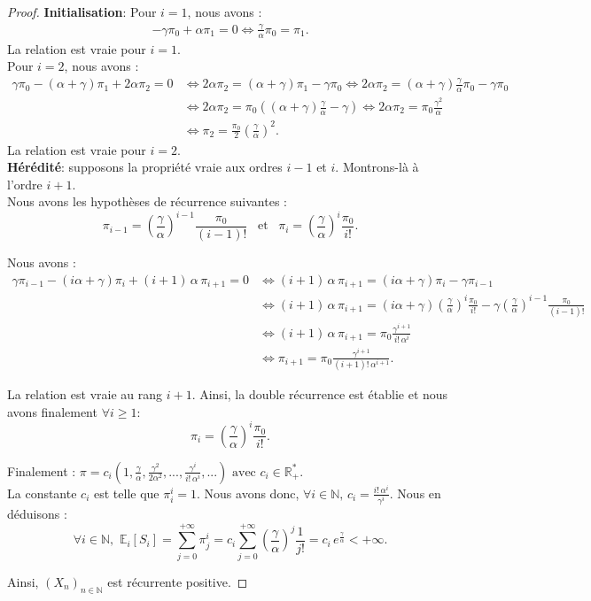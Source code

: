 \documentclass[12pt,a4paper]{report}
\theoremstyle{remark}
\begin{document}
\begin{proof}
\textbf{Initialisation}: Pour $i=1$, nous avons :
\begin{align*}
 -\gamma\pi_0+\alpha\pi_1 = 0 \iff  \frac{\gamma}{\alpha}\pi_0=\pi_1.
\end{align*}
La relation est vraie pour $i=1$.\\

Pour $i=2$, nous avons :
\begin{align*}
 \gamma\pi_{0}-(\alpha + \gamma)\pi_{1}+2\alpha\pi_{2} = 0 &\iff 2\alpha\pi_{2}=(\alpha + \gamma)\pi_{1}- \gamma\pi_{0} \iff 2\alpha\pi_{2}=(\alpha + \gamma)\frac{\gamma}{\alpha}\pi_0- \gamma\pi_{0}\\
 &\iff  2\alpha\pi_{2}=\pi_0((\alpha + \gamma)\frac{\gamma}{\alpha}- \gamma ) \iff 2\alpha\pi_{2}=\pi_0\frac{\gamma^2}{\alpha} \\
 &\iff \pi_{2}=\frac{\pi_0}{2}\left(\frac{\gamma}{\alpha}\right)^2.
\end{align*}
La relation est vraie pour $i=2$.\\

\textbf{Hérédité}: supposons la propriété vraie aux ordres $i-1$ et $i$. Montrons-là à l'ordre $i+1$.\\

Nous avons les hypothèses de récurrence suivantes :
$$\pi_{i-1} = \left(\frac{\gamma}{\alpha}\right)^{i-1}\frac{\pi_0}{(i-1)!} \, \, \, \text{ et } \, \, \, \pi_i = \left(\frac{\gamma}{\alpha}\right)^{i}\frac{\pi_0}{i!}.$$

Nous avons :
\begin{align*}
 \gamma\pi_{i-1}-(i\alpha + \gamma)\pi_{i}+(i+1) \, \alpha \, \pi_{i+1} = 0
 &\iff  (i+1) \, \alpha \, \pi_{i+1}=(i\alpha + \gamma)\pi_{i}- \gamma\pi_{i-1} \\
 &\iff  (i+1) \, \alpha \, \pi_{i+1}=(i\alpha + \gamma)\left(\frac{\gamma}{\alpha}\right)^{i}\frac{\pi_0}{i!}- \gamma\left(\frac{\gamma}{\alpha}\right)^{i-1}\frac{\pi_0}{(i-1)!}\\
&\iff (i+1) \, \alpha \, \pi_{i+1}=\pi_0\frac{\gamma^{i+1}}{i! \, \alpha^{i}}  \\
&\iff \pi_{i+1}=\pi_0\frac{\gamma^{i+1}}{(i+1)! \, \alpha^{i+1}}.
\end{align*}
 
La relation est vraie au rang $i+1$. Ainsi, la double récurrence est établie et nous avons finalement $\forall i \geqslant 1$:
$$\pi_i = \left(\frac{\gamma}{\alpha}\right)^{i}\frac{\pi_0}{i!}.$$

Finalement : $\pi = c_i \left(1, \frac{\gamma}{\alpha}, \frac{\gamma^2}{2 \alpha^2},...,\frac{\gamma^i}{i! \,  \alpha^i},... \right) \text{ avec } c_i \in \mathbb{R}_+^{*}.$ \\

La constante $c_i$ est telle que $\pi_i^i = 1$. Nous avons donc, $\forall i \in \mathbb{N}, \, c_i = \frac{i! \, \alpha^i}{\gamma^i}$. Nous en déduisons :
$$\forall i \in \mathbb{N}, \, \, \mathbb{E}_i[S_i] = \sum\limits_{j=0}^{+\infty} \pi_j^i =  c_i \sum\limits_{j=0}^{+\infty} \left(\frac{\gamma}{\alpha}\right)^j \frac{1}{j!} = c_i \, e^{\frac{\gamma}{\alpha}} < +\infty.$$

Ainsi, $(X_n)_{n \in \mathbb{N}}$ est récurrente positive.
\end{proof}
\end{document}
